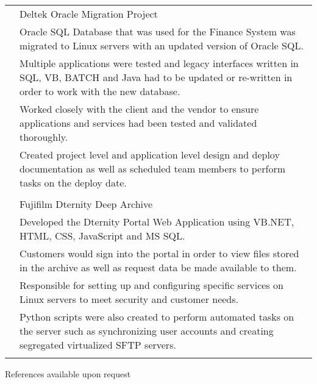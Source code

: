 \documentclass[12pt]{article}
\begin{document}
\begin{tabular}{p{2.3cm}|p{15.4cm}}
	\centering 2016 & Deltek Oracle Migration Project\\&\small{Oracle SQL Database that was used for the Finance System was migrated to Linux servers with an updated version of Oracle SQL.}\\&\small{Multiple applications were tested and legacy interfaces written in SQL, VB, BATCH and Java had to be updated or re-written in order to work with the new database.}\\&\small{Worked closely with the client and the vendor to ensure applications and services had been tested and validated thoroughly.}\\&\small{Created project level and application level design and deploy documentation as well as scheduled team members to perform tasks on the deploy date.}\\\multicolumn{2}{c}{} \\
	\centering 2015 & Fujifilm Dternity Deep Archive\\&\small{Developed the Dternity Portal Web Application using VB.NET, HTML, CSS, JavaScript and MS SQL.}\\&\small{Customers would sign into the portal in order to view files stored in the archive as well as request data be made available to them.}\\&\small{Responsible for setting up and configuring specific services on Linux servers to meet security and customer needs.}\\&\small{Python scripts were also created to perform automated tasks on the server such as synchronizing user accounts and creating segregated virtualized SFTP servers.}\\\multicolumn{2}{c}{} \\
\end{tabular}

\centering References available upon request
\end{document}
